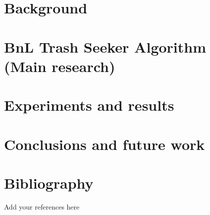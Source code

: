 \documentclass[runningheads,a4paper]{llncs}
\begin{document}
\section{Background}
\lipsum[1-3]

\section{BnL Trash Seeker Algorithm (Main research)}
\lipsum[4-14]

\section{Experiments and results}
\lipsum[15-20]

\section{Conclusions and future work}
\lipsum[21-24]

\section*{Bibliography}
Add your references here
%
%

\newpage

\end{document}
